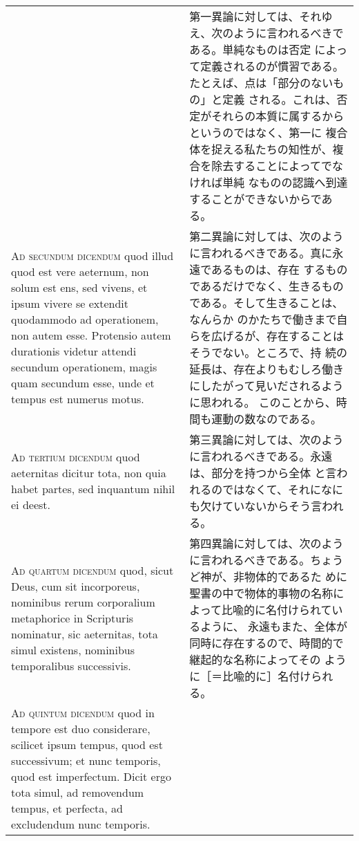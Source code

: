 \documentclass[10pt]{jsarticle} %
\begin{document}
\begin{longtable}{p{21em}p{21em}}
&

第一異論に対しては、それゆえ、次のように言われるべきである。単純なものは否定
によって定義されるのが慣習である。たとえば、点は「部分のないもの」と定義
される。これは、否定がそれらの本質に属するからというのではなく、第一に
複合体を捉える私たちの知性が、複合を除去することによってでなければ単純
なものの認識へ到達することができないからである。

\\

{\scshape Ad secundum dicendum} quod illud quod est vere aeternum, non solum est
ens, sed vivens, et ipsum vivere se extendit quodammodo ad operationem,
non autem esse. Protensio autem durationis videtur attendi secundum
operationem, magis quam secundum esse, unde et tempus est numerus motus.

&

第二異論に対しては、次のように言われるべきである。真に永遠であるものは、存在
するものであるだけでなく、生きるものである。そして生きることは、なんらか
のかたちで働きまで自らを広げるが、存在することはそうでない。ところで、持
続の延長は、存在よりもむしろ働きにしたがって見いだされるように思われる。
このことから、時間も運動の数なのである。

\\

{\scshape Ad tertium dicendum} quod aeternitas dicitur tota, non quia
habet partes, sed inquantum nihil ei deest.

&

第三異論に対しては、次のように言われるべきである。永遠は、部分を持つから全体
と言われるのではなくて、それになにも欠けていないからそう言われる。

\\

{\scshape Ad quartum dicendum} quod, sicut Deus, cum sit incorporeus,
nominibus rerum corporalium metaphorice in Scripturis nominatur, sic
aeternitas, tota simul existens, nominibus temporalibus successivis.

&

第四異論に対しては、次のように言われるべきである。ちょうど神が、非物体的であるた
めに聖書の中で物体的事物の名称によって比喩的に名付けられているように、
永遠もまた、全体が同時に存在するので、時間的で継起的な名称によってその
ように［＝比喩的に］名付けられる。


\\

{\scshape Ad quintum dicendum} quod in tempore est duo considerare,
scilicet ipsum tempus, quod est successivum; et nunc temporis, quod est
imperfectum. Dicit ergo tota simul, ad removendum tempus, et perfecta,
ad excludendum nunc temporis.


\end{longtable}
\end{document}
